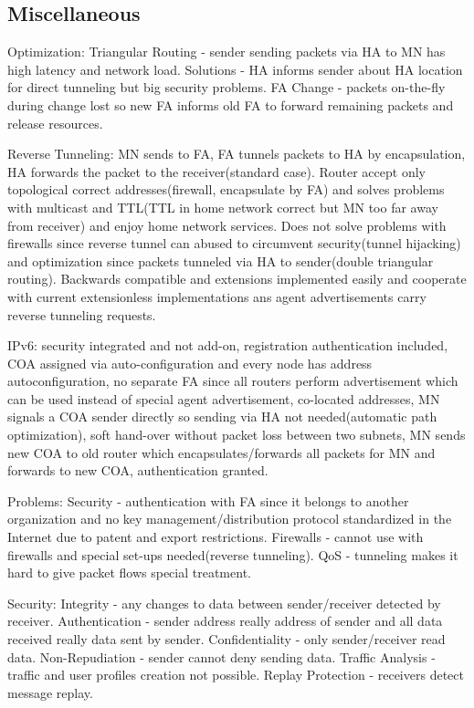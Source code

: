 \documentclass[9pt]{extarticle}
\begin{document}
\begin{multicols}{2}
\subsection{Miscellaneous}

Optimization: Triangular Routing - sender sending packets via HA to MN has high latency and network load. Solutions - HA informs sender about HA location for direct tunneling but big security problems. FA Change - packets on-the-fly during change lost so new FA informs old FA to forward remaining packets and release resources.

Reverse Tunneling: MN sends to FA, FA tunnels packets to HA by encapsulation, HA forwards the packet to the receiver(standard case). Router accept only topological correct addresses(firewall, encapsulate by FA) and solves problems with multicast and TTL(TTL in home network correct but MN too far away from receiver) and enjoy home network services. Does not solve problems with firewalls since reverse tunnel can abused to circumvent security(tunnel hijacking) and optimization since packets tunneled via HA to sender(double triangular routing). Backwards compatible and extensions implemented easily and cooperate with current extensionless implementations ans agent advertisements carry reverse tunneling requests.

IPv6: security integrated and not add-on, registration authentication included, COA assigned via auto-configuration and every node has address autoconfiguration, no separate FA since all routers perform advertisement which can be used instead of special agent advertisement, co-located addresses, MN signals a COA sender directly so sending via HA not needed(automatic path optimization), soft hand-over without packet loss between two subnets, MN sends new COA to old router which encapsulates/forwards all packets for MN and forwards to new COA, authentication granted.

Problems: Security - authentication with FA since it belongs to another organization and no key management/distribution protocol  standardized in the Internet due to patent and export restrictions. Firewalls - cannot use with firewalls and special set-ups needed(reverse tunneling). QoS - tunneling makes it hard to give packet flows special treatment.

Security: Integrity - any changes to data between sender/receiver detected by receiver. Authentication - sender address really address of sender and all data received really data sent by sender. Confidentiality - only sender/receiver read data. Non-Repudiation - sender cannot deny sending data. Traffic Analysis - traffic and user profiles creation not possible. Replay Protection - receivers detect message replay.


\end{multicols}
\end{document}
